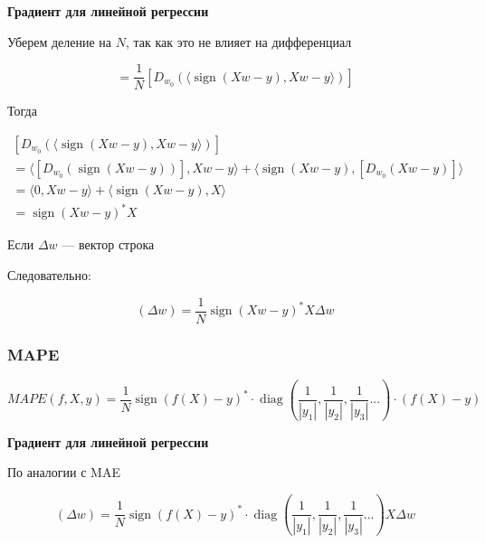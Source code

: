 \documentclass{article}
\begin{document}
    \quad

    \textbf{Градиент для линейной регрессии}

    \quad 

    Уберем деление на $N$, так как это не влияет на дифференциал


    \begin{equation}
        [D_{w_{0}}(MAE)] = \frac{1}{N} [D_{w_{0}}(\langle \operatorname{sign}(Xw - y), Xw - y \rangle)]
    \end{equation}

    Тогда 

    \[
    \begin{gathered}
        [D_{w_{0}}(\langle \operatorname{sign}(Xw - y), Xw - y \rangle)] \\ 
        = \langle [D_{w_{0}}(\operatorname{sign}(Xw - y))], Xw - y \rangle + \langle \operatorname{sign}(Xw - y), [D_{w_{0}}(Xw - y)] \rangle \\
        = \langle 0, Xw - y \rangle + \langle \operatorname{sign}(Xw - y), X \rangle \\ 
        = \operatorname{sign}(Xw - y)^{*} X
    \end{gathered}
    \]

    Если $\Delta w$ --- вектор строка

    Следовательно: 

    \begin{equation}
        [D_{w_{0}}(MAE)](\Delta w) = \frac{1}{N} \operatorname{sign}(Xw - y)^{*} X \Delta w
    \end{equation}

    \subsubsection{MAPE}

    \begin{equation}
        MAPE(f, X, y) = \frac{1}{N}  \operatorname{sign}(f(X) - y)^{*} \cdot \operatorname{diag}(\frac{1}{| y_{1} |}, \frac{1}{| y_{2} |}, \frac{1}{| y_{3} |} ...) \cdot (f(X) - y) 
    \end{equation}

    \quad 

    \textbf{Градиент для линейной регрессии}

    \quad  

    По аналогии с MAE 

    \begin{equation}
        [D_{w_{0}}(MAPE)](\Delta w) =  \frac{1}{N} \operatorname{sign}(f(X) - y)^{*} \cdot \operatorname{diag}(\frac{1}{| y_{1} |}, \frac{1}{| y_{2} |}, \frac{1}{| y_{3} |} ...) X \Delta w
    \end{equation}
\end{document}
